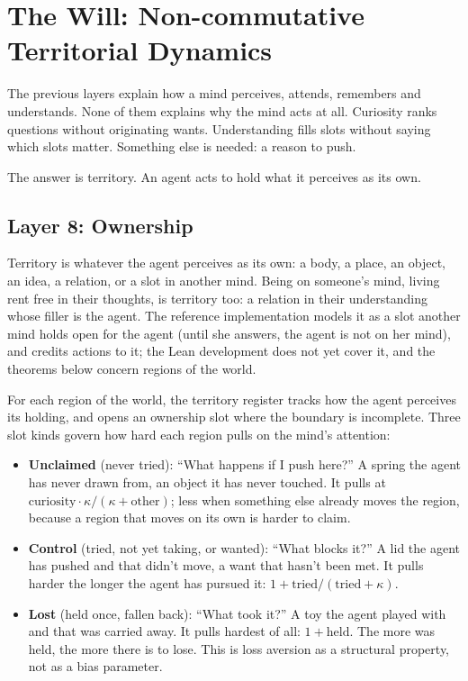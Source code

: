 \documentclass[11pt]{article}
\theoremstyle{remark}
\begin{document}
\section{The Will: Non-commutative Territorial Dynamics}
\label{sec:will}

The previous layers explain how a mind perceives, attends, remembers and understands. None
of them explains why the mind acts at all. Curiosity ranks questions without originating
wants. Understanding fills slots without saying which slots matter. Something else is needed:
a reason to push.

The answer is territory. An agent acts to hold what it perceives as its own.

\subsection{Layer 8: Ownership}

Territory is whatever the agent perceives as its own: a body, a place, an object, an idea, a
relation, or a slot in another mind. Being on someone's mind, living rent free in their
thoughts, is territory too: a relation in their understanding whose filler is the agent.
The reference implementation models it as a slot another mind holds open for the agent
(until she answers, the agent is not on her mind), and credits actions to it; the Lean
development does not yet cover it, and the theorems below concern regions of the world.

For each region of the world, the territory register tracks how the agent perceives its
holding, and opens an ownership slot where the boundary is incomplete. Three slot kinds
govern how hard each region pulls on the mind's attention:

\begin{itemize}[nosep]
    \item \textbf{Unclaimed} (never tried): ``What happens if I push here?'' A spring the
    agent has never drawn from, an object it has never touched. It pulls at
    $\mathrm{curiosity}\cdot\kappa/(\kappa + \mathrm{other})$; less when something else
    already moves the region, because a region that moves on its own is harder to claim.

    \item \textbf{Control} (tried, not yet taking, or wanted): ``What blocks it?'' A lid
    the agent has pushed and that didn't move, a want that hasn't been met. It pulls harder
    the longer the agent has pursued it: $1 + \mathrm{tried}/(\mathrm{tried} + \kappa)$.

    \item \textbf{Lost} (held once, fallen back): ``What took it?'' A toy the agent played
    with and that was carried away. It pulls hardest of all: $1 + \mathrm{held}$. The more
    was held, the more there is to lose. This is loss aversion as a structural property,
    not as a bias parameter.
\end{itemize}
\end{document}
